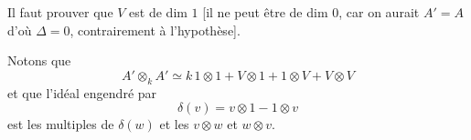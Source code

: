 \deleted{[} Il faut prouver que $V$ est de dim $1$
[il ne peut être de dim $0$, car on aurait
$A'=A$ d'où $\Delta=0$, contrairement à l'hypothèse].

 Notons que
\[
A'\otimes_k A'\simeq k\,1\otimes1+V\otimes1+1\otimes V+V\otimes V
\]
et que l'idéal engendré par
\[
\delta(v)=v\otimes1-1\otimes v
\]
est  
les multiples de $\delta(w)$ et les
$v\otimes w$ et $w\otimes v$.
